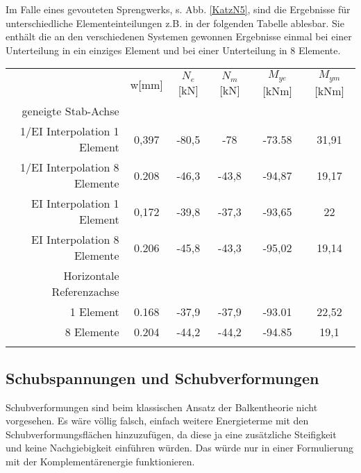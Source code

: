 Im Falle eines gevouteten Sprengwerks, s. Abb. \ref{KatzN5}, sind die Ergebnisse f\"{u}r unterschiedliche Elementeinteilungen z.B. in der folgenden Tabelle ablesbar. Sie enth\"{a}lt die an den verschiedenen Systemen gewonnen Ergebnisse einmal bei einer Unterteilung in ein einziges Element und bei einer Unterteilung in 8 Elemente.\\

{\small
\begin{tabular}{r c c c c c }
\noalign{\hrule\smallskip}
           &      w[mm] &     $N_e$[kN] &     $N_m$ [kN] &   $M_{ye}$ [kNm] &   $M_{ym}$[kNm] \\
\noalign{\hrule\smallskip}
geneigte Stab-Achse &            &            &            &            &            \\
\noalign{\hrule\smallskip}
1/EI Interpolation  1 Element &      0,397 &      -80,5 &        -78 &     -73.58 &      31,91 \\
\noalign{\hrule\smallskip}
1/EI Interpolation  8 Elemente &      0.208 &      -46,3 &      -43,8 &     -94,87 &      19,17 \\
\noalign{\hrule\smallskip}
EI Interpolation  1 Element &      0,172 &      -39,8 &      -37,3 &     -93,65 &         22 \\
\noalign{\hrule\smallskip}
EI Interpolation  8 Elemente &      0.206 &      -45,8 &      -43,3 &     -95,02 &      19,14 \\
\noalign{\hrule\smallskip}
Horizontale Referenzachse &            &            &            &            &            \\
\noalign{\hrule\smallskip}
 1 Element &      0.168 &      -37,9 &      -37,9 &     -93.01 &      22,52 \\
\noalign{\hrule\smallskip}
8 Elemente &      0.204 &      -44,2 &      -44,2 &     -94.85 &       19,1 \\
\noalign{\hrule\smallskip}
\end{tabular}
}
\vspace{0.5cm}
{\textcolor{sectionTitleBlue}{\subsection{Schubspannungen und Schubverformungen}}}
Schubverformungen sind beim klassischen Ansatz der Balkentheorie nicht vorgesehen. Es w\"{a}re v\"{o}llig falsch, einfach weitere Energieterme mit den Schubverformungsfl\"{a}chen hinzuzuf\"{u}gen, da diese ja eine zus\"{a}tzliche Steifigkeit und keine Nachgiebigkeit einf\"{u}hren w\"{u}rden. Das w\"{u}rde nur in einer Formulierung mit der Komplement\"{a}renergie funktionieren.

